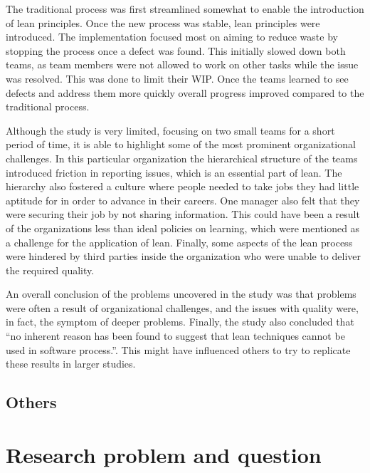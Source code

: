 The traditional process was first streamlined somewhat to enable the introduction of lean principles. Once the new process was stable, lean principles were introduced. The implementation focused most on aiming to reduce waste by stopping the process once a defect was found. This initially slowed down both teams, as team members were not allowed to work on other tasks while the issue was resolved. This was done to limit their WIP. Once the teams learned to see defects and address them more quickly overall progress improved compared to the traditional process.\cite{Middleton2001Lean}

Although the study is very limited, focusing on two small teams for a short period of time, it is able to highlight some of the most prominent organizational challenges. In this particular organization the hierarchical structure of the teams introduced friction in reporting issues, which is an essential part of lean. The hierarchy also fostered a culture where people needed to take jobs they had little aptitude for in order to advance in their careers. One manager also felt that they were securing their job by not sharing information. This could have been a result of the organizations less than ideal policies on learning, which were mentioned as a challenge for the application of lean. Finally, some aspects of the lean process were hindered by third parties inside the organization who were unable to deliver the required quality.\cite{Middleton2001Lean}

An overall conclusion of the problems uncovered in the study was that problems were often a result of organizational challenges, and the issues with quality were, in fact, the symptom of deeper problems. Finally, the study also concluded that ``no inherent reason has been found to suggest that lean techniques cannot be used in software process.''\cite{Middleton2001Lean}. This might have influenced others to try to replicate these results in larger studies.



\subsection{Others}
\label{othercases}

\section{Research problem and question}
\label{section:problem}

